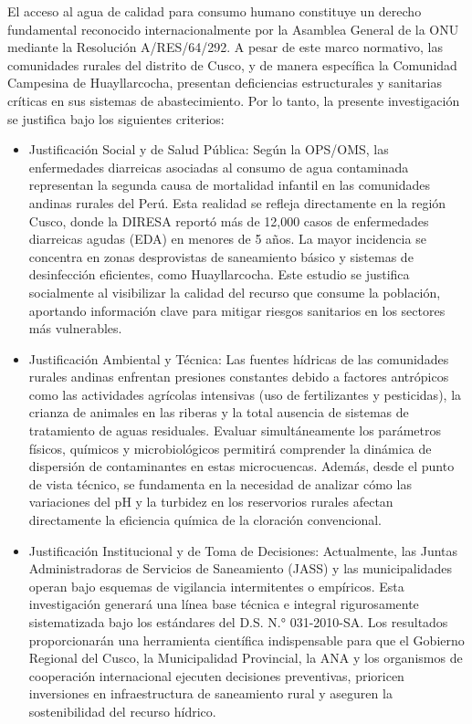 El acceso al agua de calidad para consumo humano constituye un derecho fundamental reconocido internacionalmente por la Asamblea General de la ONU mediante la Resolución A/RES/64/292. A pesar de este marco normativo, las comunidades rurales del distrito de Cusco, y de manera específica la Comunidad Campesina de Huayllarcocha, presentan deficiencias estructurales y sanitarias críticas en sus sistemas de abastecimiento. Por lo tanto, la presente investigación se justifica bajo los siguientes criterios:

\begin{itemize}
    \item Justificación Social y de Salud Pública: Según la OPS/OMS, las enfermedades diarreicas asociadas al consumo de agua contaminada representan la segunda causa de mortalidad infantil en las comunidades andinas rurales del Perú. Esta realidad se refleja directamente en la región Cusco, donde la DIRESA reportó más de 12,000 casos de enfermedades diarreicas agudas (EDA) en menores de 5 años. La mayor incidencia se concentra en zonas desprovistas de saneamiento básico y sistemas de desinfección eficientes, como Huayllarcocha. Este estudio se justifica socialmente al visibilizar la calidad del recurso que consume la población, aportando información clave para mitigar riesgos sanitarios en los sectores más vulnerables.
    \item Justificación Ambiental y Técnica: Las fuentes hídricas de las comunidades rurales andinas enfrentan presiones constantes debido a factores antrópicos como las actividades agrícolas intensivas (uso de fertilizantes y pesticidas), la crianza de animales en las riberas y la total ausencia de sistemas de tratamiento de aguas residuales. Evaluar simultáneamente los parámetros físicos, químicos y microbiológicos permitirá comprender la dinámica de dispersión de contaminantes en estas microcuencas. Además, desde el punto de vista técnico, se fundamenta en la necesidad de analizar cómo las variaciones del pH y la turbidez en los reservorios rurales afectan directamente la eficiencia química de la cloración convencional.
    \item Justificación Institucional y de Toma de Decisiones: Actualmente, las Juntas Administradoras de Servicios de Saneamiento (JASS) y las municipalidades operan bajo esquemas de vigilancia intermitentes o empíricos. Esta investigación generará una línea base técnica e integral rigurosamente sistematizada bajo los estándares del D.S. N.° 031-2010-SA. Los resultados proporcionarán una herramienta científica indispensable para que el Gobierno Regional del Cusco, la Municipalidad Provincial, la ANA y los organismos de cooperación internacional ejecuten decisiones preventivas, prioricen inversiones en infraestructura de saneamiento rural y aseguren la sostenibilidad del recurso hídrico.
\end{itemize}

